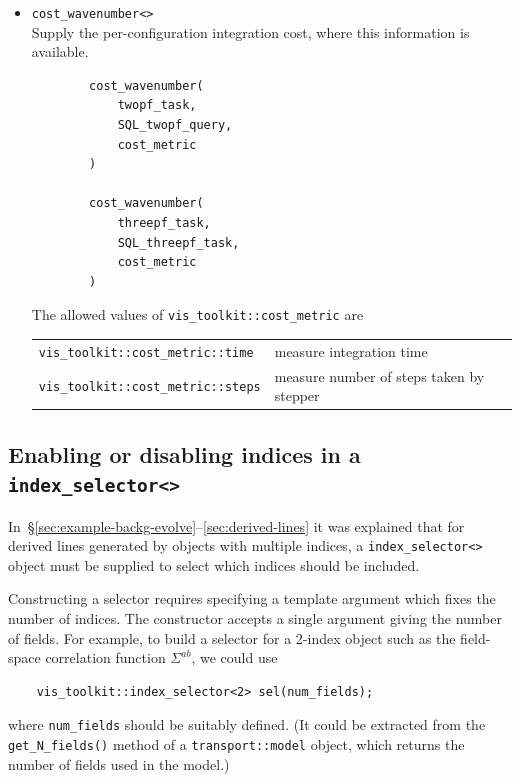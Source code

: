 \documentclass[11pt,a4paper]{article}
\begin{document}
\begin{itemize}
    \item \texttt{cost_wavenumber<>} \\
    Supply the per-configuration integration cost, where this information is
    available.
    \begin{verbatim}
        cost_wavenumber(
            twopf_task,    
            SQL_twopf_query,
            cost_metric
        )
        
        cost_wavenumber(
            threepf_task,
            SQL_threepf_task,
            cost_metric
        )
    \end{verbatim}
    The allowed values of \texttt{vis_toolkit::cost_metric}
    are \\
    \begin{tabular}{p{6cm}p{8.5cm}}
        \texttt{vis_toolkit::cost_metric::time} &
            measure integration time \\
        \texttt{vis_toolkit::cost_metric::steps} &
            measure number of steps taken by stepper
    \end{tabular}

\end{itemize}

\subsection{Enabling or disabling indices in a \texttt{index_selector<>}}
\label{sec:index-selector}

In~\S\ref{sec:example-backg-evolve}--\ref{sec:derived-lines}
it was explained that
for derived lines generated by objects with multiple indices, a
\texttt{index_selector<>} object must be supplied
to select which indices should be included.

Constructing a selector requires specifying a template argument which fixes the
number of indices.
The constructor accepts a single argument giving the number
of fields.
For example, to build a selector for a 2-index object such as the field-space
correlation function $\Sigma^{ab}$, we could use
\begin{verbatim}
	vis_toolkit::index_selector<2> sel(num_fields);
\end{verbatim}
where \texttt{num_fields} should be suitably defined.
(It could be extracted from the \texttt{get_N_fields()} method of a
\texttt{transport::model} object, which returns the number of
fields used in the model.)
\end{document}
